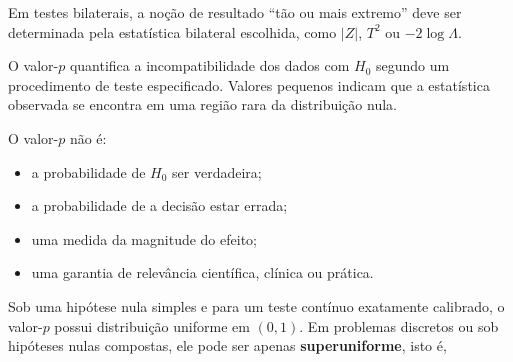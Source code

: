 \documentclass[
  letterpaper,
  DIV=11,
  numbers=noendperiod]{scrreprt}
\providecommand{\tightlist}{%
  \setlength{\itemsep}{0pt}\setlength{\parskip}{0pt}}\usepackage{longtable,booktabs,array}
\begin{document}
Em testes bilaterais, a noção de resultado ``tão ou mais extremo'' deve
ser determinada pela estatística bilateral escolhida, como \(|Z|\),
\(T^2\) ou \(-2\log\Lambda\).

\begin{tcolorbox}[enhanced jigsaw, colback=white, leftrule=.75mm, colbacktitle=quarto-callout-note-color!10!white, breakable, titlerule=0mm, bottomtitle=1mm, title=\textcolor{quarto-callout-note-color}{\faInfo}\hspace{0.5em}{Interpretação}, colframe=quarto-callout-note-color-frame, toprule=.15mm, opacityback=0, bottomrule=.15mm, opacitybacktitle=0.6, arc=.35mm, toptitle=1mm, rightrule=.15mm, coltitle=black, left=2mm]

O valor-\(p\) quantifica a incompatibilidade dos dados com \(H_0\)
segundo um procedimento de teste especificado. Valores pequenos indicam
que a estatística observada se encontra em uma região rara da
distribuição nula.

\end{tcolorbox}

\begin{tcolorbox}[enhanced jigsaw, colback=white, leftrule=.75mm, colbacktitle=quarto-callout-important-color!10!white, breakable, titlerule=0mm, bottomtitle=1mm, title=\textcolor{quarto-callout-important-color}{\faExclamation}\hspace{0.5em}{O que o valor-\(p\) não representa}, colframe=quarto-callout-important-color-frame, toprule=.15mm, opacityback=0, bottomrule=.15mm, opacitybacktitle=0.6, arc=.35mm, toptitle=1mm, rightrule=.15mm, coltitle=black, left=2mm]

O valor-\(p\) não é:

\begin{itemize}
\tightlist
\item
  a probabilidade de \(H_0\) ser verdadeira;
\item
  a probabilidade de a decisão estar errada;
\item
  uma medida da magnitude do efeito;
\item
  uma garantia de relevância científica, clínica ou prática.
\end{itemize}

\end{tcolorbox}

Sob uma hipótese nula simples e para um teste contínuo exatamente
calibrado, o valor-\(p\) possui distribuição uniforme em \((0,1)\). Em
problemas discretos ou sob hipóteses nulas compostas, ele pode ser
apenas \textbf{superuniforme}, isto é,
\end{document}
